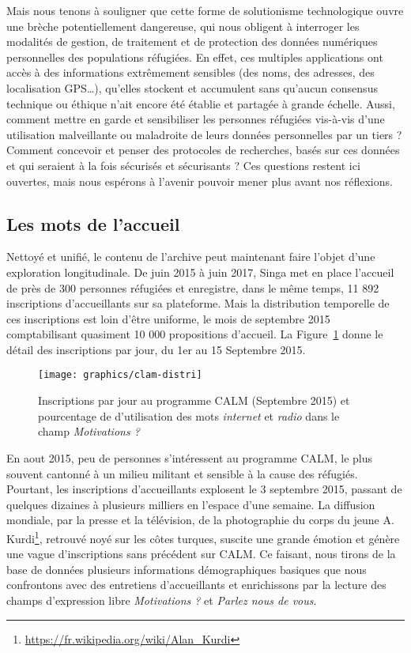 \documentclass[symmetric,justified,marginals=raggedouter]{tufte-book}
\begin{document}
Mais nous tenons à souligner que cette forme de solutionisme technologique \citep{morozov_save_2013} ouvre une brèche potentiellement dange\-reuse, qui nous obligent à interroger les modalités de gestion, de traitement et de protection des données numériques personnelles des populations réfugiées. En effet, ces multiples applications ont accès à des informations extrêmement sensibles (des noms, des adresses, des localisation GPS\ldots{}), qu'elles stockent et accumulent sans qu'aucun consensus technique ou éthique n'ait encore été établie et partagée à grande échelle. Aussi, comment mettre en garde et sensibiliser les personnes réfugiées vis-à-vis d'une utilisation malveillante ou maladroite de leurs données personnelles par un tiers ? Comment concevoir et penser des protocoles de recherches, basés sur ces données et qui seraient à la fois sécurisés et sécurisants ? Ces questions restent ici ouvertes, mais nous espérons à l'avenir pouvoir mener plus avant nos réflexions.

\subsection{Les mots de l'accueil}

\noindent Nettoyé et unifié, le contenu de l'archive peut maintenant faire l'objet d'une exploration longitudinale. De juin 2015 à juin 2017, Singa met en place l'accueil de près de 300 personnes réfugiées et enregistre, dans le même temps, 11 892 inscriptions d'accueillants sur sa plateforme. Mais la distribution temporelle de ces inscriptions est loin d'être uniforme, le mois de septembre 2015 comptabilisant quasiment 10 000 propositions d'accueil. La Figure~\ref{fig:calm-distri} donne le détail des inscriptions par jour, du 1er au 15 Septembre 2015.

\begin{figure}
  \texttt{[image: graphics/clam-distri]}
  \caption{Inscriptions par jour au programme CALM (Septembre 2015) et pourcentage de d'utilisation des mots \textit{internet} et \textit{radio} dans le champ \textit{Motivations ?}}
  \label{fig:calm-distri}
\end{figure}

\noindent En aout 2015, peu de personnes s'intéressent au programme CALM, le plus souvent cantonné à un milieu militant et sensible à la cause des réfugiés. Pourtant, les inscriptions d'accueillants explosent le 3 septembre 2015, passant de quelques dizaines à plusieurs milliers en l'espace d'une semaine. La diffusion mondiale, par la presse et la télévision, de la photographie du corps du jeune A. Kurdi\footnote{\RaggedOuter \url{https://fr.wikipedia.org/wiki/Alan_Kurdi}}, retrouvé noyé sur les côtes turques, suscite une grande émotion et génère une vague d'inscriptions sans précédent sur CALM. Ce faisant, nous tirons de la base de données plusieurs informations démographiques basiques que nous confrontons avec des entretiens d'accueillants et enrichissons par la lecture des champs d'expression libre \textit{Motivations ?} et \textit{Parlez nous de vous}. 
\end{document}
